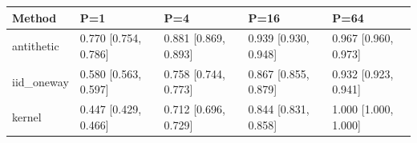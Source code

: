 \begingroup\footnotesize\setlength{\tabcolsep}{3pt}
\begin{tabular}{lllll}
\toprule
Method & P=1 & P=4 & P=16 & P=64 \\
\midrule
antithetic & 0.770 [0.754, 0.786] & 0.881 [0.869, 0.893] & 0.939 [0.930, 0.948] & 0.967 [0.960, 0.973] \\
iid\_oneway & 0.580 [0.563, 0.597] & 0.758 [0.744, 0.773] & 0.867 [0.855, 0.879] & 0.932 [0.923, 0.941] \\
kernel & 0.447 [0.429, 0.466] & 0.712 [0.696, 0.729] & 0.844 [0.831, 0.858] & 1.000 [1.000, 1.000] \\
\bottomrule
\end{tabular}
\endgroup
